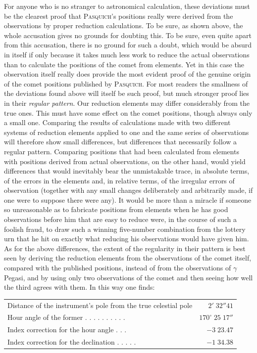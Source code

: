 For anyone who is no stranger to astronomical calculation, these deviations
must be the clearest proof that \textsc{Pasquich}'s positions really were derived
from the observations by proper reduction calculations. To be sure, as shown above, the
whole accusation gives no grounds for doubting this. To be sure, even quite
apart from this accusation, there is no ground for such a doubt, which would
be absurd in itself if only because it takes much less work to reduce the
actual observations than to calculate the positions of the comet from
elements. Yet in this case the observation itself really does provide the
most evident proof of the genuine origin of the comet positions published
by \textsc{Pasquich}. For most readers the smallness of the deviations found
above will itself be such proof, but much \enlargethispage{1pt} stronger proof lies in their \emph{regular pattern}.
Our reduction elements may differ considerably from the true ones. This
must have some effect on the comet positions, though always only a small one.
Comparing the results of calculations made with two different systems of
reduction elements applied to one and the same series of observations will
therefore show small differences, but differences that necessarily follow
a regular pattern. Comparing positions that had been calculated from
elements with positions derived from actual observations, on the other
hand, would yield differences that would inevitably bear the unmistakable
trace, in absolute terms, of the errors in the elements and, in relative
terms, of the irregular errors of observation (together with any small
changes deliberately and arbitrarily made, if one were to suppose there
were any). It would be more than a miracle if someone so unreasonable as
to fabricate positions from elements when he has good observations before him that
are easy to reduce were, in the course of such a foolish fraud, to draw
such a winning five-number combination from the lottery urn that he hit
on exactly what reducing his observations would have given him. As for
the above differences, the extent of the regularity in their pattern is
best seen by deriving the reduction elements from the observations of the comet
itself, compared with the published positions, instead of from the observations
of $\gamma$ Pegasi, and by using only two observations of the comet and then
seeing how well the third agrees with them. In this way one finds:

\begin{center}\footnotesize\setlength{\tabcolsep}{3pt}
\begin{tabular}{@{}l r@{}}
Distance of the instrument's pole from the true celestial pole & $2'\;32''41$\\
Hour angle of the former . . . . . . . . . . & $170^\circ\;25\;17''$\\
Index correction for the hour angle . . . & $-3\;23.47$\\
Index correction for the declination . . . . . & $-1\;34.38$
\end{tabular}\end{center}


